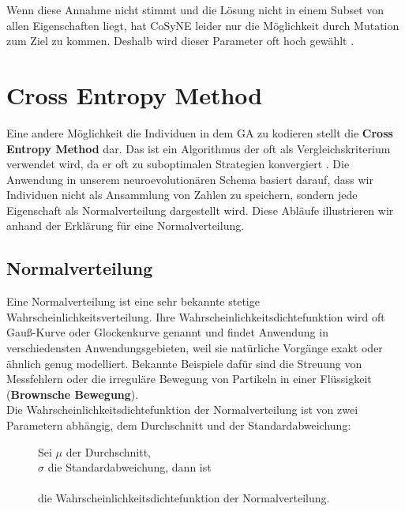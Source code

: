             \noindent
            Wenn diese Annahme nicht stimmt und die Lösung nicht in einem Subset von allen Eigenschaften liegt, hat CoSyNE leider nur die Möglichkeit durch Mutation zum Ziel zu kommen. Deshalb wird dieser Parameter oft hoch gewählt \cite{cosyne1}\cite{cosyne2}\cite{cosyne3}.



\newpage
    \section{Cross Entropy Method} \label{cross-entropy-definition}
        Eine andere Möglichkeit die Individuen in dem GA zu kodieren stellt die \textbf{Cross Entropy Method} dar. Das ist ein Algorithmus der oft als Vergleichskriterium verwendet wird, da er oft zu suboptimalen Strategien konvergiert \cite{cem}. Die Anwendung in unserem neuroevolutionären Schema basiert darauf, dass wir Individuen nicht als Ansammlung von Zahlen zu speichern, sondern jede Eigenschaft als Normalverteilung dargestellt wird. Diese Abläufe illustrieren wir anhand der Erklärung für eine Normalverteilung.

        \subsection{Normalverteilung}

            Eine Normalverteilung ist eine sehr bekannte stetige Wahrscheinlichkeitsverteilung. Ihre Wahrscheinlichkeitsdichtefunktion wird oft Gauß-Kurve oder Glockenkurve genannt und findet Anwendung in verschiedensten Anwendungsgebieten, weil sie natürliche Vorgänge exakt oder ähnlich genug modelliert. Bekannte Beispiele dafür sind die Streuung von Messfehlern oder die irreguläre Bewegung von Partikeln in einer Flüssigkeit (\textbf{Brownsche Bewegung}).\\

            \noindent
            Die Wahrscheinlichkeitsdichtefunktion der Normalverteilung ist von zwei Parametern abhängig, dem Durchschnitt und der Standardabweichung:

            \begin{figure}[H]
                \begin{mdframed}
                    \noindent
                    Sei $\mu$ der Durchschnitt,\\
                    \hspace*{4.5mm}    $\sigma$ die Standardabweichung, dann ist\\[4mm]
                    \hspace*{50mm}  \\[4mm]
                    \hspace*{4.5mm} die Wahrscheinlichkeitsdichtefunktion der Normalverteilung.
                \end{mdframed}
            \end{figure}

